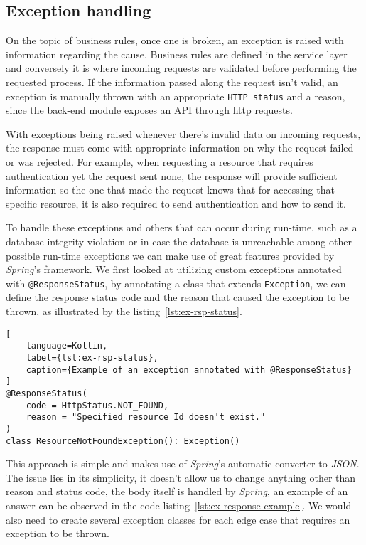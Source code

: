 \subsection{Exception handling}

On the topic of business rules, once one is broken, an exception is raised with information regarding the cause. Business rules are defined in the service layer and conversely it is where incoming requests are validated before performing the requested process. If the information passed along the request isn't valid, an exception is manually thrown with an appropriate \texttt{HTTP status} and a reason, since the back-end module exposes an API through http requests. 

With exceptions being raised whenever there's invalid data on incoming requests, the response must come with appropriate information on why the request failed or was rejected. For example, when requesting a resource that requires authentication yet the request sent none, the response will provide sufficient information so the one that made the request knows that for accessing that specific resource, it is also required to send authentication and how to send it.

To handle these exceptions and others that can occur during run-time, such as a database integrity violation or in case the database is unreachable among other possible run-time exceptions we can make use of great features provided by \textit{Spring}'s framework. We first looked at utilizing custom exceptions annotated with \texttt{@ResponseStatus}, by annotating a class that extends \texttt{Exception}, we can define the response status code and the reason that caused the exception to be thrown, as illustrated by the listing~\ref{lst:ex-rsp-status}. 

\begin{lstlisting}[
    language=Kotlin,
    label={lst:ex-rsp-status},
    caption={Example of an exception annotated with @ResponseStatus}
]
@ResponseStatus(
    code = HttpStatus.NOT_FOUND, 
    reason = "Specified resource Id doesn't exist."
)
class ResourceNotFoundException(): Exception()
\end{lstlisting}

This approach is simple and makes use of \textit{Spring}'s automatic converter to \textit{JSON}. The issue lies in its simplicity, it doesn't allow us to change anything other than reason and status code, the body itself is handled by \textit{Spring}, an example of an answer can be observed in the code listing~\ref{lst:ex-response-example}. 
We would also need to create several exception classes for each edge case that requires an exception to be thrown.

